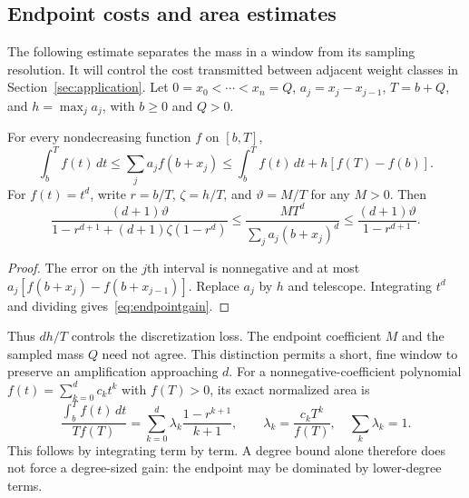 \documentclass[manuscript,review,anonymous]{acmart}
\begin{document}
\subsection{Endpoint costs and area estimates}\label{sec:area}
The following estimate separates the mass in a window from its sampling resolution. It will control the cost transmitted between adjacent weight classes in Section~\ref{sec:application}.
Let $0=x_0<\cdots<x_n=Q$, $a_j=x_j-x_{j-1}$, $T=b+Q$, and $h=\max_ja_j$, with $b\ge0$ and $Q>0$.
\begin{lemma}\label{lem:area}
For every nondecreasing function $f$ on $[b,T]$,
\begin{equation}\label{eq:areaerror}
 \int_b^Tf(t)\,dt\le\sum_ja_jf(b+x_j)
 \le\int_b^Tf(t)\,dt+h[f(T)-f(b)].
\end{equation}
For $f(t)=t^d$, write $r=b/T$, $\zeta=h/T$, and $\vartheta=M/T$ for any $M>0$. Then
\begin{equation}\label{eq:endpointgain}
 \frac{(d+1)\vartheta}{1-r^{d+1}+(d+1)\zeta(1-r^d)}
 \le\frac{MT^d}{\sum_ja_j(b+x_j)^d}
 \le\frac{(d+1)\vartheta}{1-r^{d+1}}.
\end{equation}
\end{lemma}
\begin{proof}
The error on the $j$th interval is nonnegative and at most
$a_j[f(b+x_j)-f(b+x_{j-1})]$. Replace $a_j$ by $h$ and telescope. Integrating $t^d$ and dividing gives~\eqref{eq:endpointgain}.
\end{proof}
Thus $dh/T$ controls the discretization loss. The endpoint coefficient $M$ and the sampled mass $Q$ need not agree. This distinction permits a short, fine window to preserve an amplification approaching $d$.
For a nonnegative-coefficient polynomial $f(t)=\sum_{k=0}^dc_kt^k$ with $f(T)>0$, its exact normalized area is
\begin{equation}\label{eq:mixturearea}
 \frac{\int_b^Tf(t)\,dt}{Tf(T)}
 =\sum_{k=0}^d\lambda_k\frac{1-r^{k+1}}{k+1},\qquad
 \lambda_k=\frac{c_kT^k}{f(T)},\quad\sum_k\lambda_k=1.
\end{equation}
This follows by integrating term by term. A degree bound alone therefore does not force a degree-sized gain: the endpoint may be dominated by lower-degree terms.
\end{document}
